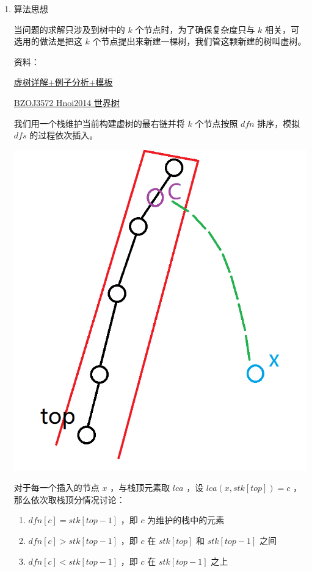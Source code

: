 \documentclass[11pt]{article}
\begin{document}
\begin{enumerate}
\item 算法思想
\label{sec-6-5-4-1}


当问题的求解只涉及到树中的 $k$ 个节点时，为了确保复杂度只与 $k$ 相关，可选用的做法是把这 $k$ 个节点提出来新建一棵树，我们管这颗新建的树叫虚树。

资料：

\href{https://www.cnblogs.com/chenhuan001/p/5639482.html}{虚树详解+例子分析+模板}

\href{http://lazycal.logdown.com/posts/202331-bzoj3572}{BZOJ3572 Hnoi2014 世界树}

我们用一个栈维护当前构建虚树的最右链并将 $k$ 个节点按照 $dfn$ 排序，模拟 $dfs$ 的过程依次插入。

\includegraphics[width=.9\linewidth]{./Source/Picture/virtualtree.png}

对于每一个插入的节点 $x$ ，与栈顶元素取 $lca$ ，设 $lca(x,stk[top])=c$ ，那么依次取栈顶分情况讨论：

\begin{enumerate}
\item $dfn[c]=stk[top-1]$ ，即 $c$ 为维护的栈中的元素
\item $dfn[c]>stk[top-1]$ ，即 $c$ 在 $stk[top]$ 和 $stk[top-1]$ 之间
\item $dfn[c]<stk[top-1]$ ，即 $c$ 在 $stk[top-1]$ 之上
\end{enumerate}


\end{enumerate}
\end{document}
